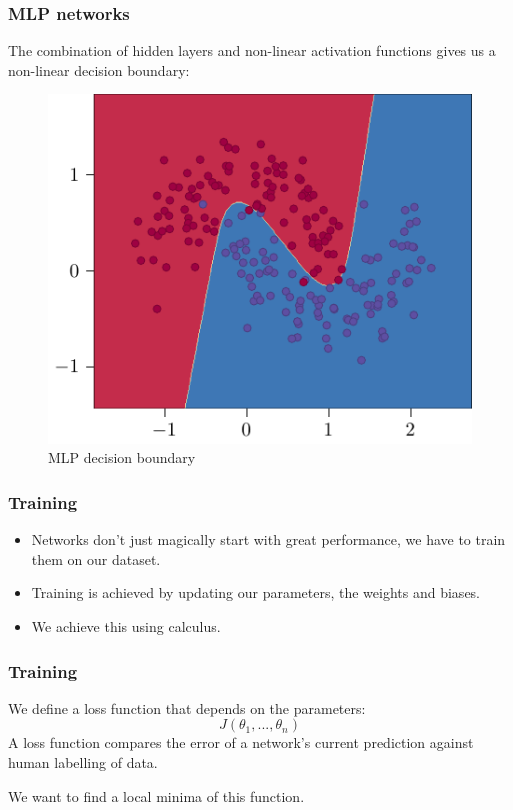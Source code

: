\documentclass{beamer}
\begin{document}
\begin{frame}
    \frametitle{MLP networks}
    The combination of \alert{hidden layers} and \alert{non-linear activation functions} gives us a \alert{non-linear decision boundary}:
    \begin{figure}
        \centering
        \includegraphics[height=0.6\textheight]{figures/non-linear-boundary/main.pdf}
        \caption{MLP decision boundary}
    \end{figure}
\end{frame}

\begin{frame}
    \frametitle{Training}
    \begin{itemize}
        \item Networks don't just magically start with great performance, we have to \alert{train} them on our dataset. \pause
        \item \alert{Training} is achieved by updating our \alert{parameters}, the weights and biases. \pause
        \item We achieve this using \alert{calculus}.
    \end{itemize}
\end{frame}

\begin{frame}
    \frametitle{Training}
    We define a \alert{loss function} that depends on the parameters:
    \[J(\theta_1,... , \theta_n)\]
    A loss function compares the error of a network's current prediction against human labelling of data.
    \vspace{0.5cm}

    We want to find a local minima of this function.
\end{frame}
\end{document}
